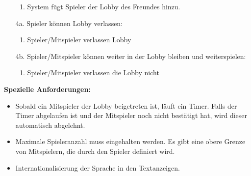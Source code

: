 \documentclass[11pt,ngerman]{article}
\begin{document}
\begin{tcolorbox}
\begin{itemize}
\begin{enumerate}
    			\item System fügt Spieler der \Gls{Lobby} des Freundes hinzu.
    		\end{enumerate}
    		\item[4a.] Spieler können \Gls{Lobby} verlassen:
    		\begin{enumerate}
    			\item Spieler/Mitspieler verlassen \Gls{Lobby}
    		\end{enumerate}
    		\item[4b.] Spieler/Mitspieler können weiter in der \Gls{Lobby} bleiben und weiterspielen:
    		\begin{enumerate}
    			\item Spieler/Mitspieler verlassen die \Gls{Lobby} nicht
    		\end{enumerate}
    	\end{itemize}
    	\textbf{Spezielle Anforderungen:}
    	\begin{itemize}
    		\item Sobald ein Mitspieler der \Gls{Lobby} beigetreten ist, läuft ein Timer. Falls der Timer abgelaufen ist und der Mitspieler noch nicht bestätigt hat, wird dieser automatisch abgelehnt.
    		\item Maximale Spieleranzahl muss eingehalten werden. Es gibt eine obere Grenze von Mitspielern, die durch den Spieler definiert wird.
    		\item Internationalisierung der Sprache in den Textanzeigen.
    	\end{itemize}

    \end{tcolorbox}
\end{document}
